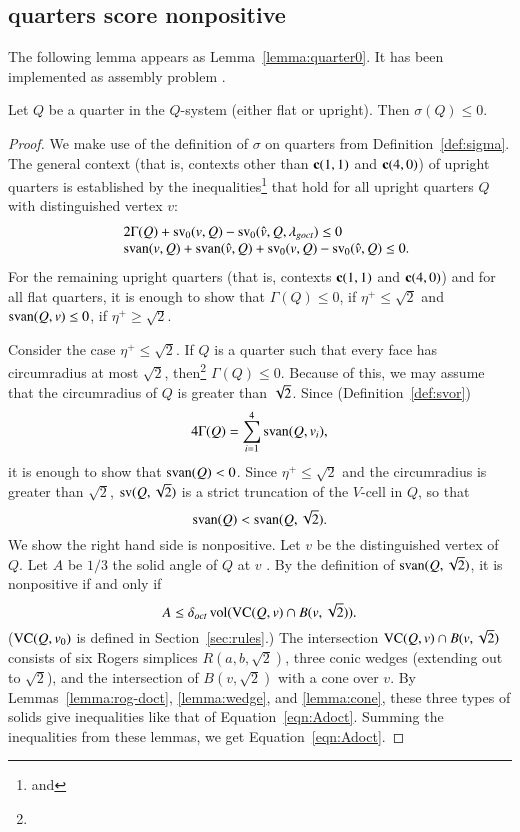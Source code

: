 \subsection{quarters score nonpositive}

The following lemma appears as Lemma~\ref{lemma:quarter0}.
It has been implemented as assembly problem .

\begin{lemma} %
Let $Q$ be a quarter in the $Q$-system (either flat or upright).
Then $\sigma(Q)\le 0$. 
\end{lemma}


\begin{proof}  
We make use
of the definition of $\sigma$ on quarters from
Definition~\ref{def:sigma}. The general context (that is, contexts
other than ${\operatorname{\bf c}}{(1,1)}$ and ${\operatorname{\bf c}}{(4,0)}$) of upright quarters is established
by the inequalities\footnote{ and
} that hold for all upright quarters $Q$ with
distinguished vertex $v$:
    $$
    \begin{array}{lll}
    &2\Gamma(Q) + {\operatorname{sv}}_0(v,Q) - {\operatorname{sv}}_0(\hat v,Q,\lambda_{goct}) \le 0\\
    &{\operatorname{svan}}(v,Q) + {\operatorname{svan}}(\hat v,Q) 
  +{\operatorname{sv}}_0(v,Q) - {\operatorname{sv}}_0(\hat v,Q)\le0.
    \end{array}
    $$
For the remaining upright quarters (that is, contexts ${\operatorname{\bf c}}{(1,1)}$ and ${\operatorname{\bf c}}{(4,0)}$)
and for all flat quarters,
it is enough to show that $\Gamma(Q)\le0$, if $\eta^+\le\sqrt2$ and
${\operatorname{svan}}(Q,v)\le0$, if $\eta^+\ge\sqrt2$.

Consider the case $\eta^+\le\sqrt2$.  If $Q$ is a quarter such that
every face has circumradius at most $\sqrt2$,
then\footnote{} $\Gamma(Q)\le0$.  
Because of this, we may assume that the circumradius of $Q$ is
greater than $\sqrt2$. 
Since
(Definition~\ref{def:svor})
    $$4\Gamma(Q)=\sum_{i=1}^4 {\operatorname{svan}}(Q,v_i),$$
it is enough to show that ${\operatorname{svan}}(Q)<0$.  Since $\eta^+\le\sqrt2$ 
and the circumradius is greater than
$\sqrt2$, ${\operatorname{sv}}(Q,\sqrt2)$ is a strict truncation of the $V$-cell
in $Q$, so that
    $${\operatorname{svan}}(Q)<{\operatorname{svan}}(Q,\sqrt2).$$
We show the right hand side is nonpositive.  Let $v$ be the
distinguished vertex of $Q$.  Let $A$ be $1/3$ the solid angle of
$Q$ at $v$ . By the definition of ${\operatorname{svan}}(Q,\sqrt2)$, it is
nonpositive if and only if
    \begin{equation}
        A\le \delta_{oct} \,{\operatorname{vol}}({\operatorname{VC}}(Q,v)\cap B(v,\sqrt2)).
        \label{eqn:Adoct}
    \end{equation}
(${\operatorname{VC}}(Q,v_0)$ is defined in Section~\ref{sec:rules}.) The
intersection ${\operatorname{VC}}(Q,v)\cap B(v,\sqrt2)$ consists of six Rogers
simplices $R(a,b,\sqrt2)$, three conic wedges (extending out to
$\sqrt2$), and the intersection of $B(v,\sqrt2)$ with a cone over
$v$. By Lemmas~\ref{lemma:rog-doct}, \ref{lemma:wedge}, and
\ref{lemma:cone}, these three types of solids give inequalities like
that of Equation~\ref{eqn:Adoct}. Summing the inequalities from
these lemmas, we get Equation~\ref{eqn:Adoct}.


\end{proof}
